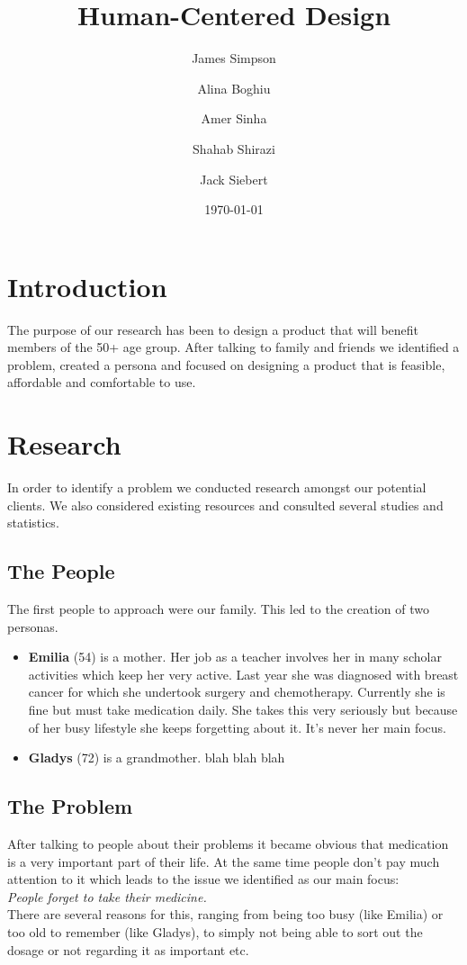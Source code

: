 \documentclass[12pt]{article}
\begin{document}
\title{Human-Centered Design}
\author{James Simpson \and Alina Boghiu \and Amer Sinha \and Shahab Shirazi \and Jack Siebert}
\date{\today}
\maketitle

\section{Introduction}
The purpose of our research has been to design a product that will benefit members of the 50+ age group. After talking to family and friends we identified a problem, created a persona and focused on designing a product that is feasible, affordable and comfortable to use.

\section{Research}
In order to identify a problem we conducted research amongst our potential clients. We also considered existing resources and consulted several studies and statistics.

	\subsection{The People}
	The first people to approach were our family. This led to the creation of two personas.

	\begin{itemize}
	\item \textbf{Emilia} (54) is a mother. Her job as a teacher involves her in many scholar activities which keep her very active. Last year she was diagnosed with breast cancer for which she undertook surgery and chemotherapy. Currently she is fine but must take medication daily. She takes this very seriously but because of her busy lifestyle she keeps forgetting about it. It's never her main focus.

	\item \textbf{Gladys} (72) is a grandmother. blah blah blah
	\end{itemize}

	\subsection{The Problem}
	After talking to people about their problems it became obvious that medication is a very important part of their life. At the same time people don't pay much attention to it which leads to the issue we identified as our main focus:\medskip \\ \emph{People forget to take their medicine.} \medskip \\
	There are several reasons for this, ranging from being too busy (like Emilia) or too old to remember (like Gladys), to simply not being able to sort out the dosage or not regarding it as important etc.
\end{document}
